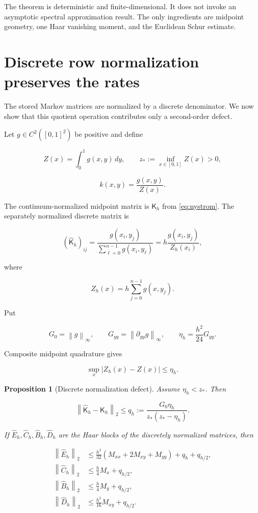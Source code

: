 \documentclass[11pt]{article}
\newtheorem{proposition}[theorem]{Proposition}
\theoremstyle{definition}
\theoremstyle{remark}
\newcommand{\norm}[1]{\left\lVert #1\right\rVert}
\begin{document}
The theorem is deterministic and finite-dimensional.  It does not invoke an
asymptotic spectral approximation result.  The only ingredients are midpoint
geometry, one Haar vanishing moment, and the Euclidean Schur estimate.

\section{Discrete row normalization preserves the rates}
\label{sec:normalization}

The stored Markov matrices are normalized by a discrete denominator.  We now
show that this quotient operation contributes only a second-order defect.

Let $g\in C^2([0,1]^2)$ be positive and define

\[
Z(x)=\int_0^1g(x,y)\,dy,\qquad
z_*:=\inf_{x\in[0,1]}Z(x)>0,
\]

\[
k(x,y)=\frac{g(x,y)}{Z(x)}.
\]

The continuum-normalized midpoint matrix is $\mathsf K_h$ from
\eqref{eq:nystrom}.  The separately normalized discrete matrix is

\begin{equation}
(\widehat{\mathsf K}_h)_{ij}
=\frac{g(x_i,y_j)}{\sum_{\ell=0}^{n-1}g(x_i,y_\ell)}
=h\frac{g(x_i,y_j)}{Z_h(x_i)},
\label{eq:discrete-normalization}
\end{equation}

where

\[
Z_h(x)=h\sum_{j=0}^{n-1}g(x,y_j).
\]

Put

\[
G_0=\norm{g}_\infty,\qquad G_{yy}=\norm{\partial_{yy}g}_\infty,
\qquad \eta_h=\frac{h^2}{24}G_{yy}.
\]

Composite midpoint quadrature gives

\begin{equation}
\sup_x|Z_h(x)-Z(x)|\le\eta_h.
\label{eq:normalizer-error}
\end{equation}

\begin{proposition}[Discrete normalization defect]
\label{prop:normalization}
Assume $\eta_h<z_*$.  Then

\begin{equation}
\norm{\widehat{\mathsf K}_h-\mathsf K_h}_2
\le q_h:=\frac{G_0\eta_h}{z_*(z_*-\eta_h)}.
\label{eq:q-h}
\end{equation}

If $\widehat E_h,\widehat C_h,\widehat B_h,\widehat D_h$ are the Haar blocks
of the discretely normalized matrices, then

\begin{align}
\norm{\widehat E_h}_2
&\le\frac{h^2}{32}(M_{xx}+2M_{xy}+M_{yy})+q_h+q_{h/2},
\label{eq:E-normalized}\\
\norm{\widehat C_h}_2
&\le\frac h4M_x+q_{h/2},
\label{eq:C-normalized}\\
\norm{\widehat B_h}_2
&\le\frac h4M_y+q_{h/2},
\label{eq:B-normalized}\\
\norm{\widehat D_h}_2
&\le\frac{h^2}{16}M_{xy}+q_{h/2}.
\label{eq:D-normalized}
\end{align}
\end{proposition}
\end{document}

